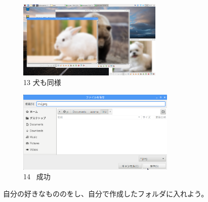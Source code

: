 \documentclass[a4paper,12pt]{jarticle}
\begin{document}
\begin{figure}[t]
  \begin{minipage}{\textwidth}
    \begin{minipage}{7.22cm}
      \includegraphics[width=6.911cm]{textbook-img105.png}\\
      13 犬も同様
    \end{minipage}
    \begin{minipage}{2.582cm}
    \end{minipage}
    \begin{minipage}{7.665cm}
      \includegraphics[width=7.527cm]{textbook-img104.png}\\
      14 \ 成功
    \end{minipage}
  \end{minipage}


  \centering
\end{figure}

\bigskip

\theQuestion\label{Q:hasAnswer02-6}

自分の好きなもののをし、自分で作成したフォルダに入れよう。

\clearpage
\end{document}
